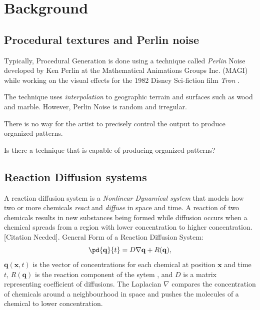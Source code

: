 \section{Background}
\label{sec:research}

\subsection{Procedural textures and Perlin noise}
\label{sec:procedural}
Typically, Procedural Generation is done using a technique called \emph{Perlin} Noise developed by Ken Perlin at the Mathematical Animations Groups Inc. (MAGI) while working on the visual effects for the 1982 Disney Sci-fiction film \emph{Tron} \cite{perlin1985}.

The technique uses \emph{interpolation} to geographic terrain and surfaces such as  wood and marble. However, Perlin Noise is random and irregular.

There is no way for the artist to precisely control the output to produce organized patterns.

Is there a technique that is capable of producing organized patterns?


\subsection{Reaction Diffusion systems}
\label{sec:rd-systems}

A reaction diffusion system is a \textit{Nonlinear Dynamical system} that models how two or more chemicals \textit{react} and \textit{diffuse} in space and time. A reaction of two chemicals results in new substances being formed while diffusion occurs when a chemical spreads from a region with lower concentration to higher concentration. [Citation Needed].
General Form of a Reaction Diffusion System:
\begin{equation}
	\label{eq:rd-general}
	\pd{\mathbf{q}}{t} = D \nabla \mathbf{q} + R(\mathbf{q}),
\end{equation}
$\mathbf{q}(\mathbf{x}, t)$ is the vector of concentrations for each chemical at position $\mathbf{x}$
and time $t$, $R(\mathbf{q})$ is the reaction component of the sytem , and $D$ is a matrix representing coefficient of diffusions. The Laplacian $\nabla$ compares the concentration of chemicals around a neighbourhood in space and pushes the molecules of a chemical to lower concentration.

